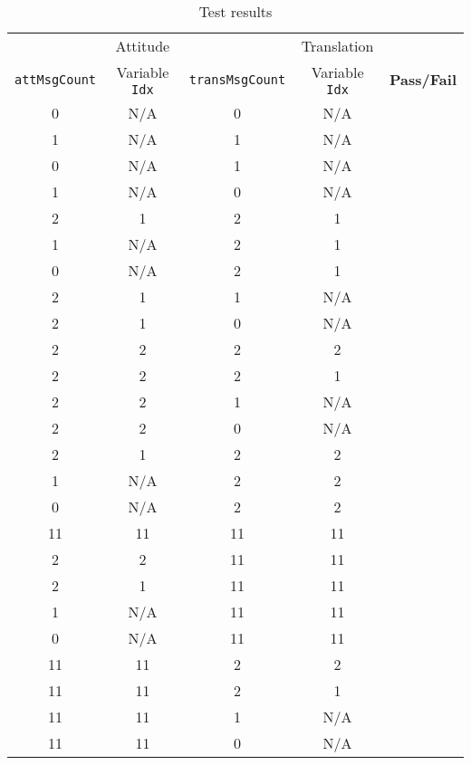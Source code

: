 \begin{table}[H]
	\caption{Test results}
	\label{tab:results}
	\centering \fontsize{10}{10}\selectfont
	\begin{tabular}{c | c | c | c | c  } %
		\hline\hline
		 & Attitude  &  & Translation  & \\ 
		{\tt attMsgCount} &  Variable {\tt Idx} & {\tt transMsgCount} &  Variable {\tt Idx} &\textbf{Pass/Fail} \\ 
		\hline
	   0 & N/A  & 0 & N/A &  \\ 
	   1 & N/A  & 1 & N/A &  \\ 
	   0 & N/A  & 1 & N/A &  \\ 
	   1 & N/A  & 0 & N/A &  \\ 
	   2 & 1  & 2 & 1 &  \\ 
	   1 & N/A  & 2 & 1 &  \\ 
	   0 & N/A  & 2 & 1 &  \\ 
	   2 & 1  & 1 & N/A &  \\ 
	   2 & 1  & 0 & N/A &  \\ 
	   2 & 2  & 2 & 2 &  \\ 
	   2 & 2  & 2 & 1 &  \\ 
	   2 & 2  & 1 & N/A &  \\ 
	   2 & 2  & 0 & N/A &  \\ 
	   2 & 1  & 2 & 2 &  \\ 
	   1 & N/A  & 2 & 2 &  \\ 
	   0 & N/A & 2 & 2 &  \\ 
	   11 & 11 & 11 & 11 &  \\ 
	   2 & 2 & 11 & 11 &  \\ 
	   2 & 1 & 11 & 11 &  \\ 
	   1 & N/A & 11 & 11 &  \\ 
	   0 & N/A & 11 & 11 &  \\ 
	   11 & 11 & 2 & 2 &  \\ 
	   11 & 11 & 2 & 1 &  \\ 
	   11 & 11 & 1 & N/A &  \\ 
	   11 & 11 & 0 & N/A &  \\ 
	   \hline\hline
	\end{tabular}
\end{table}

